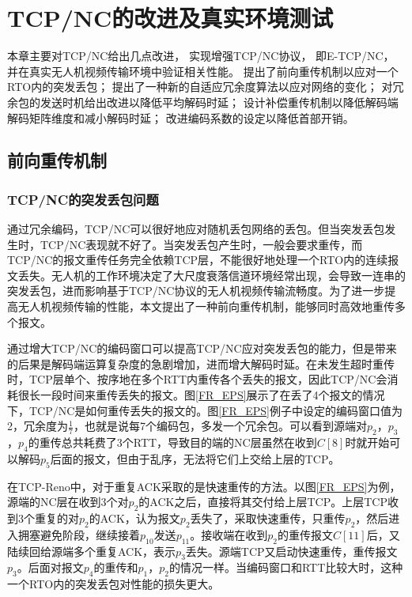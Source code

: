 \chapter{TCP/NC的改进及真实环境测试}
本章主要对TCP/NC给出几点改进，
实现增强TCP/NC协议，
即E-TCP/NC，
并在真实无人机视频传输环境中验证相关性能。
提出了前向重传机制以应对一个RTO内的突发丢包；
提出了一种新的自适应冗余度算法以应对网络的变化；
对冗余包的发送时机给出改进以降低平均解码时延；
设计补偿重传机制以降低解码端解码矩阵维度和减小解码时延；
改进编码系数的设定以降低首部开销。
\section{前向重传机制}
\subsection{TCP/NC的突发丢包问题}
通过冗余编码，TCP/NC可以很好地应对随机丢包网络的丢包。但当突发丢包发生时，TCP/NC表现就不好了。当突发丢包产生时，一般会要求重传，而TCP/NC的报文重传任务完全依赖TCP层，不能很好地处理一个RTO内的连续报文丢失。无人机的工作环境决定了大尺度衰落信道环境经常出现，会导致一连串的突发丢包，进而影响基于TCP/NC协议的无人机视频传输流畅度。为了进一步提高无人机视频传输的性能，本文提出了一种前向重传机制，能够同时高效地重传多个报文。
\par
通过增大TCP/NC的编码窗口可以提高TCP/NC应对突发丢包的能力，但是带来的后果是解码端运算复杂度的急剧增加，进而增大解码时延。在未发生超时重传时，TCP层单个、按序地在多个RTT内重传各个丢失的报文，因此TCP/NC会消耗很长一段时间来重传丢失的报文。图\ref{FR_EPS}展示了在丢了4个报文的情况下，TCP/NC是如何重传丢失的报文的。图\ref{FR_EPS}例子中设定的编码窗口值为2，冗余度为$\frac{1}{7}$，也就是说每7个编码包，多发一个冗余包。可以看到源端对$p_2$，$p_3$，$p_4$的重传总共耗费了3个RTT，导致目的端的NC层虽然在收到$C\left[8\right]$时就开始可以解码$p_5$后面的报文，但由于乱序，无法将它们上交给上层的TCP。
\par
在TCP-Reno中，对于重复ACK采取的是快速重传的方法。以图\ref{FR_EPS}为例，源端的NC层在收到3个对$p_2$的ACK之后，直接将其交付给上层TCP。上层TCP收到3个重复的对$p_2$的ACK，认为报文$p_2$丢失了，采取快速重传，只重传$p_2$，然后进入拥塞避免阶段，继续接着$p_{10}$发送$p_{11}$。接收端在收到$p_2$的重传报文$C\left[11\right]$后，又陆续回给源端多个重复ACK，表示$p_3$丢失。源端TCP又启动快速重传，重传报文$p_3$。后面对报文$p_4$的重传和$p_1$，$p_2$的情况一样。当编码窗口和RTT比较大时，这种一个RTO内的突发丢包对性能的损失更大。
\par

